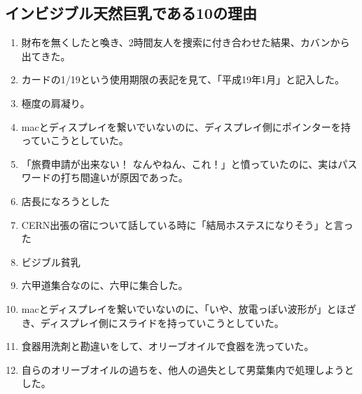 \subsection{インビジブル天然巨乳である10の理由}
\begin{enumerate}
\item 財布を無くしたと喚き、2時間友人を捜索に付き合わせた結果、カバンから出てきた。
\item カードの1/19という使用期限の表記を見て、「平成19年1月」と記入した。
\item 極度の肩凝り。
\item macとディスプレイを繋いでいないのに、ディスプレイ側にポインターを持っていこうとしていた。
\item「旅費申請が出来ない！ なんやねん、これ！」と憤っていたのに、実はパスワードの打ち間違いが原因であった。
\item 店長になろうとした
\item CERN出張の宿について話している時に「結局ホステスになりそう」と言った
\item ビジブル貧乳
\item 六甲道集合なのに、六甲に集合した。
\item macとディスプレイを繋いでいないのに、「いや、放電っぽい波形が」とほざき、ディスプレイ側にスライドを持っていこうとしていた。
\item 食器用洗剤と勘違いをして、オリーブオイルで食器を洗っていた。
\item 自らのオリーブオイルの過ちを、他人の過失として男葉集内で処理しようとした。
\end{enumerate}

\newpage
